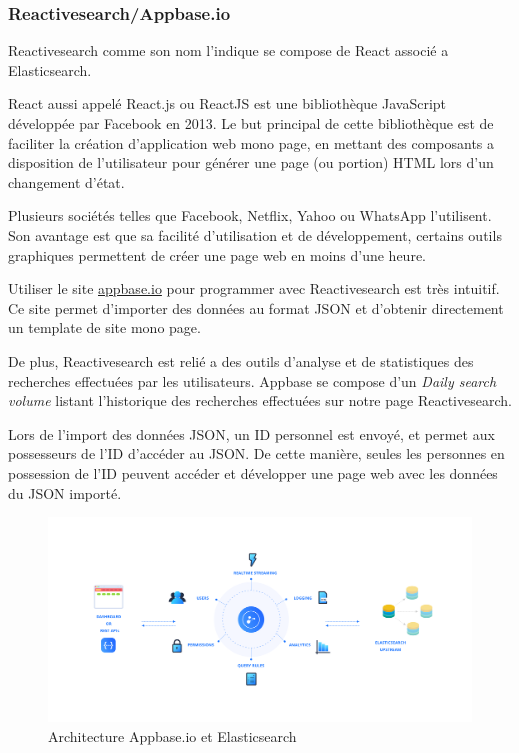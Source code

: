 \subsubsection{Reactivesearch/Appbase.io}
Reactivesearch comme son nom l’indique se compose de React associé a Elasticsearch.

React aussi appelé React.js ou ReactJS est une bibliothèque JavaScript développée par Facebook en 2013.
Le but principal de cette bibliothèque est de faciliter la création d’application web mono page, en mettant des composants a disposition de l'utilisateur pour générer une page (ou portion) HTML lors d'un changement d'état.

Plusieurs sociétés telles que Facebook, Netflix, Yahoo ou WhatsApp l’utilisent.
Son avantage est que sa facilité d'utilisation et de développement, certains outils graphiques permettent de créer une page web en moins d'une heure.

Utiliser le site \href{https://appbase.io/}{appbase.io} pour programmer avec Reactivesearch est très intuitif.
Ce site permet d’importer des données au format JSON et d'obtenir directement un template de site mono page\@.

De plus, Reactivesearch est relié a des outils d'analyse et de statistiques des recherches effectuées par les utilisateurs.
Appbase se compose d’un \textit{Daily search volume} listant l’historique des recherches effectuées sur notre page Reactivesearch. 

Lors de l’import des données JSON, un ID personnel est envoyé, et permet aux possesseurs de l'ID d’accéder au JSON\@.
De cette manière, seules les personnes en possession de l'ID peuvent accéder et développer une page web avec les données du JSON importé. 

\begin{figure}[h!]
  \centering
  \includegraphics[width=\textwidth]{images/ArchitectureElasticsearchAppbase.png}
	\caption[]{Architecture Appbase.io et Elasticsearch}
	\label{archi_appbase}
\end{figure}

